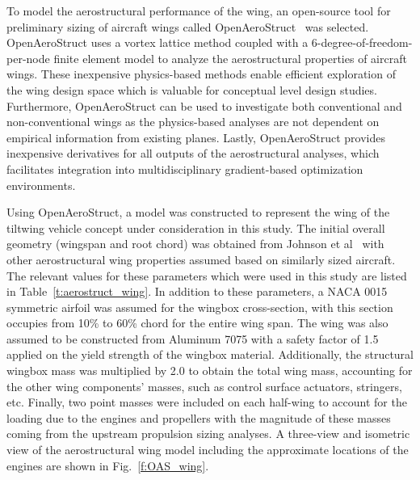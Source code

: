 
To model the aerostructural performance of the wing, an open-source tool for preliminary sizing of aircraft wings called OpenAeroStruct~\cite{Jasa2018a} was selected.
OpenAeroStruct uses a vortex lattice method coupled with a 6-degree-of-freedom-per-node finite element model to analyze the aerostructural properties of aircraft wings.
These inexpensive physics-based methods enable efficient exploration of the wing design space which is valuable for conceptual level design studies.
Furthermore, OpenAeroStruct can be used to investigate both conventional and non-conventional wings as the physics-based analyses are not dependent on empirical information from existing planes.
Lastly, OpenAeroStruct provides inexpensive derivatives for all outputs of the aerostructural analyses, which facilitates integration into multidisciplinary gradient-based optimization environments.

Using OpenAeroStruct, a model was constructed to represent the wing of the tiltwing vehicle concept under consideration in this study.
The initial overall geometry (wingspan and root chord) was obtained from Johnson et al~\cite{johnson2018concept} with other aerostructural wing properties assumed based on similarly sized aircraft.
The relevant values for these parameters which were used in this study are listed in Table~\ref{t:aerostruct_wing}.
In addition to these parameters, a NACA 0015 symmetric airfoil was assumed for the wingbox cross-section, with this section occupies from 10\% to 60\% chord for the entire wing span.
The wing was also assumed to be constructed from Aluminum 7075 with a safety factor of 1.5 applied on the yield strength of the wingbox material.
Additionally, the structural wingbox mass was multiplied by 2.0 to obtain the total wing mass, accounting for the other wing components' masses, such as control surface actuators, stringers, etc. 
Finally, two point masses were included on each half-wing to account for the loading due to the engines and propellers with the magnitude of these masses coming from the upstream propulsion sizing analyses.
A three-view and isometric view of the aerostructural wing model including the approximate locations of the engines are shown in Fig.~\ref{f:OAS_wing}.

